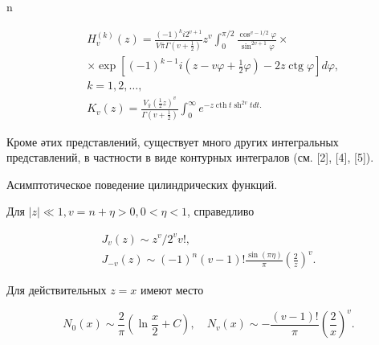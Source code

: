 \documentclass[10pt]{article}
\begin{document}
n



\[

\begin{aligned}

& H_{v}^{(k)}(z)=\frac{(-1)^{k} i 2^{v+1}}{V \bar{\pi} \Gamma\left(v+\frac{1}{2}\right)} z^{v} \int_{0}^{\pi / 2} \frac{\cos ^{v-1 / 2} \varphi}{\sin ^{2 v+1} \varphi} \times \\

& \times \exp \left[(-1)^{k-1} i\left(z-v \varphi+\frac{1}{2} \varphi\right)-2 z \operatorname{ctg} \varphi\right] d \varphi, \\

& k=1,2, \ldots \text {, } \\

& K_{v}(z)=\frac{V_{\bar{\pi}}\left(\frac{1}{2} z\right)^{v}}{\Gamma\left(v+\frac{1}{2}\right)} \int_{0}^{\infty} e^{-z \operatorname{cth} t \operatorname{sh}^{2 v} t d t .}

\end{aligned}

\]



Кроме әтих представлений, существует много других интегральных представлений, в частности в виде контурных интегралов (см. [2], [4], [5]).



Асимптотическое поведение цилиндрических функций.



Для $|z| \ll 1, v=n+\eta>0,0<\eta<1$, справедливо



\[

\begin{gathered}

J_{v}(z) \sim z^{v} / 2^{v} v !, \\

J_{-v}(z) \sim(-1)^{n}(v-1) ! \frac{\sin (\pi \eta)}{\pi}\left(\frac{2}{z}\right)^{v} .

\end{gathered}

\]



Для действительных $z=x$ имеют место



\[

N_{0}(x) \sim \frac{2}{\pi}\left(\ln \frac{x}{2}+C\right), \quad N_{v}(x) \sim-\frac{(v-1) !}{\pi}\left(\frac{2}{x}\right)^{v} .

\]
\end{document}
